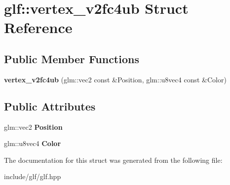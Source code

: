 \hypertarget{structglf_1_1vertex__v2fc4ub}{\section{glf\-:\-:vertex\-\_\-v2fc4ub Struct Reference}
\label{structglf_1_1vertex__v2fc4ub}
}
\subsection*{Public Member Functions}
\begin{DoxyCompactItemize}
\item 
\hypertarget{structglf_1_1vertex__v2fc4ub_a52455f592976ac3276ceefc33badc8cc}{{\bfseries vertex\-\_\-v2fc4ub} (glm\-::vec2 const \&Position, glm\-::u8vec4 const \&Color)}\label{structglf_1_1vertex__v2fc4ub_a52455f592976ac3276ceefc33badc8cc}

\end{DoxyCompactItemize}
\subsection*{Public Attributes}
\begin{DoxyCompactItemize}
\item 
\hypertarget{structglf_1_1vertex__v2fc4ub_ac99016a21c7f4a2e1af3d5d2107d1d50}{glm\-::vec2 {\bfseries Position}}\label{structglf_1_1vertex__v2fc4ub_ac99016a21c7f4a2e1af3d5d2107d1d50}

\item 
\hypertarget{structglf_1_1vertex__v2fc4ub_a7a0acf0a6e02a74891d6ab5d6bc80e4d}{glm\-::u8vec4 {\bfseries Color}}\label{structglf_1_1vertex__v2fc4ub_a7a0acf0a6e02a74891d6ab5d6bc80e4d}

\end{DoxyCompactItemize}


The documentation for this struct was generated from the following file\-:\begin{DoxyCompactItemize}
\item 
include/glf/glf.\-hpp\end{DoxyCompactItemize}
